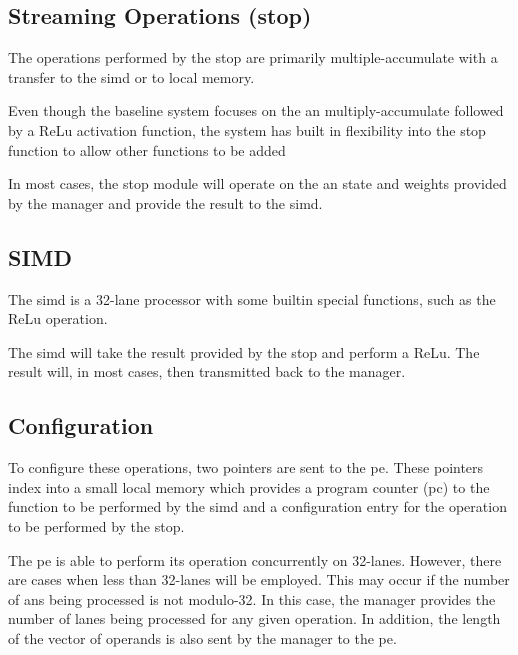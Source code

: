 \subsection{Streaming Operations (\ac{stop})}
\label{sec:streamingOps}
The operations performed by the \ac{stop} are primarily multiple-accumulate with a transfer to the \ac{simd} or to local memory.

Even though the baseline system focuses on the \ac{an} multiply-accumulate followed by a ReLu activation function, the system has built in flexibility into the \ac{stop} function to allow other functions to be added

In most cases, the \ac{stop} module will operate on the \ac{an} state and weights provided by the manager and provide the result to the \ac{simd}.
\subsection{SIMD}
\label{sec:SIMD}

The \ac{simd} is a 32-lane processor with some builtin special functions, such as the ReLu operation.

The \ac{simd} will take the result provided by the \ac{stop} and perform a ReLu. The result will, in most cases, then transmitted back to the manager.

\subsection{Configuration}
\label{sec:peConfiguration}

To configure these operations, two pointers are sent to the \ac{pe}. These pointers index into a small local memory which provides a program counter (\ac{pc}) to the function to be performed by the \ac{simd} and a configuration entry for the operation to be performed by the \ac{stop}.

The \ac{pe} is able to perform its operation concurrently on 32-lanes. However, there are cases when less than 32-lanes will be employed. This may occur if the number of \acp{an} being processed is not modulo-32. In this case, the manager provides the number of lanes being processed for any given operation. In addition, the length of the vector of operands is also sent by the manager to the \ac{pe}.
\fi

